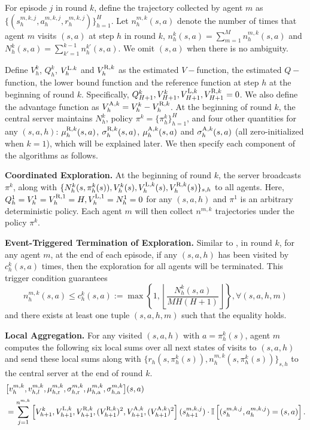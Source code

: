 \documentclass{article}
\newcommand{\LL}{\textnormal{L}}
\newcommand{\R}{\textnormal{R}}
\newcommand{\nr}{\textnormal{r}}
\newcommand{\A}{\textnormal{A}}
\newcommand{\na}{\textnormal{a}}
\begin{document}
For episode $j$ in round $k$, define the trajectory collected by agent $m$ as $\{(s_h^{m,k,j}, a_h^{m,k,j}, r_h^{m,k,j})\}_{h=1}^H$. Let $n_h^{m,k}(s,a)$ denote the number of times that agent $m$ visits $(s,a)$ at step $h$ in round $k$, $n_h^k(s,a) = \sum_{m=1}^M n_h^{m,k}(s,a)$ and $N_h^k(s,a) = \sum_{k'=1}^{k-1} n_h^{k'}(s,a)$. We omit $(s,a)$ when there is no ambiguity. 

Define $V_{h}^k$, $Q_{h}^k$, $V_{h}^{\LL.k}$ and $V^{\R, k}_{h}$ as the estimated $V-$function, the estimated $Q-$function, the lower bound function and the reference function at step $h$ at the beginning of round $k$. Specifically, $Q_{H+1}^k,V_{H+1}^k,V_{H+1}^{\LL,k}, V_{H+1}^{\R,k} = 0$. We also define the advantage function as $V_{h}^{\A,k} = V_{h}^{k} - V_{h}^{\R,k}$. At the beginning of round $k$, the central server maintains $N_h^k$, policy $\pi^k = \{\pi_h^k\}_{h=1}^H$, and four other quantities for any $(s,a,h)$: $\mu_h^{\R,k}(s,a)$, $\sigma_h^{\R,k}(s,a)$, $\mu_h^{\A, k}(s,a)$ and $\sigma_h^{\A, k}(s,a)$ (all zero-initialized when $k=1$), which will be explained later. We then specify each component of the algorithms as follows.

\textbf{Coordinated Exploration.} At the beginning of round $k$, the server broadcasts $\pi^k$, along with $\{N_h^k(s,\pi_{h}^k(s)),V_h^k(s),V_h^{\LL,k}(s),V_h^{\R,k}(s)\}_{s,h}$ to all agents. Here, $Q_h^1 = V_h^1 = V_h^{\R, 1} = H, V_h^{\LL,1} = N_h^1=0$ for any $(s,a,h)$ and $\pi^1$ is an arbitrary deterministic policy. Each agent $m$ will then collect $n^{m,k}$ trajectories under the policy $\pi^k$.

 
\textbf{Event-Triggered Termination of Exploration.} Similar to \cite{zheng2023federated}, in round $k$, for any agent $m$, at the end of each episode, if any $(s,a,h)$ has been visited by $c_h^k(s,a)$ times, then the exploration for all agents will be terminated. This trigger condition guarantees
\begin{equation}\label{rough_num_ep}
    n_h^{m,k}(s,a) \leq c_h^k(s,a) :=\max\left\{1, \left\lfloor \frac{N_h^k(s,a)}{M H(H+1)} \right\rfloor \right\}, \forall (s,a,h,m)
\end{equation}
and there exists at least one tuple \( (s,a,h,m) \) such that the equality holds.
 
\textbf{Local Aggregation.}
For any visited \( (s,a,h) \) with \( a = \pi_h^k(s) \), agent $m$ computes the following six local sums over all next states of visits to \( (s,a,h) \) and send these local sums along with \( \{r_h(s, \pi_h^k(s)), n_h^{m,k}(s, \pi_h^k(s))\}_{s,h} \) to the central server at the end of round $k$.
\begin{align}
\label{localsum}
    &\big[v_h^{m,k}, v_{h,l}^{m,k}, \mu_{h,\nr}^{m,k}, \sigma_{h,\nr}^{m,k}, \mu_{h,\na}^{m,k}, \sigma_{h,\na}^{m,k}\big](s,a) \nonumber\\
    &= \sum_{j=1}^{n^{m,k}} 
    \left[V_{h+1}^k, V_{h+1}^{\LL,k}, V_{h+1}^{\R,k},(V_{h+1}^{\R,k})^2, V_{h+1}^{\A,k}, (V_{h+1}^{\A,k})^2\right](s_{h+1}^{m,k,j})\cdot\mathbb{I}\left[(s_h^{m,k,j},a_h^{m,k,j}) = (s,a)\right].
\end{align}
\end{document}
